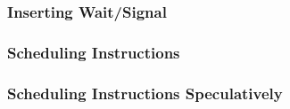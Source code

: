 \subsubsection{Inserting Wait/Signal}


\subsubsection{Scheduling Instructions}


\subsubsection{Scheduling Instructions Speculatively}